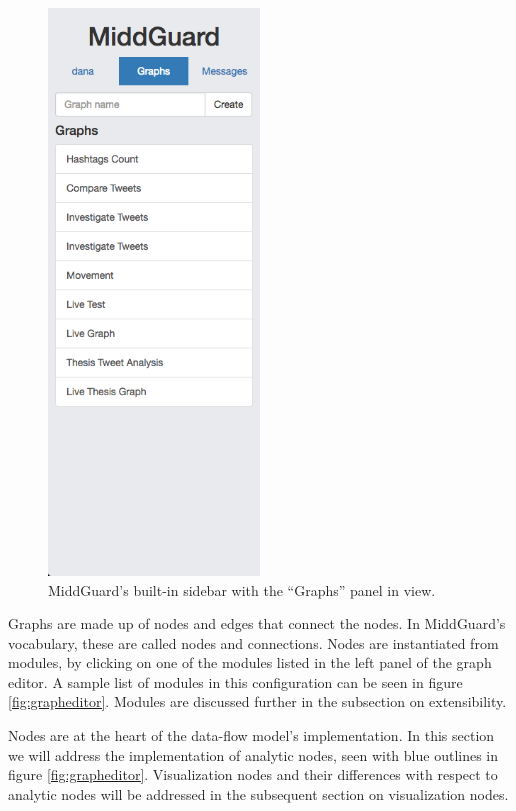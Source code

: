 \documentclass[midd]{thesis}
\begin{document}
\begin{figure}[!ht]
  \centering
  \includegraphics[width=0.5\textwidth]{sidebar-graphs-panel}
  \caption{MiddGuard's built-in sidebar with the ``Graphs'' panel in view.}
  \label{fig:sidebar}
\end{figure}

Graphs are made up of nodes and edges that connect the nodes. In MiddGuard's
vocabulary, these are called nodes and connections. Nodes are instantiated from
modules, by clicking on one of the modules listed in the left panel of the graph
editor. A sample list of modules in this configuration can be seen in figure
\ref{fig:grapheditor}. Modules are discussed further in the subsection on
extensibility.

Nodes are at the heart of the data-flow model's implementation. In this section
we will address the implementation of analytic nodes, seen with blue outlines in
figure \ref{fig:grapheditor}. Visualization nodes and their differences with
respect to analytic nodes will be addressed in the subsequent section on
visualization nodes.
\end{document}
